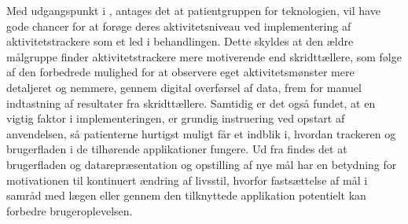 Med udgangspunkt i \cite{mercer2016}, antages det at patientgruppen for teknologien, vil have gode chancer for at forøge deres aktivitetsniveau ved implementering af aktivitetstrackere som et led i behandlingen. Dette skyldes at den ældre målgruppe finder aktivitetstrackere mere motiverende end skridttællere, som følge af den forbedrede mulighed for at observere eget aktivitetsmønster mere detaljeret og nemmere, gennem digital overførsel af data, frem for manuel indtastning af resultater fra skridttællere. Samtidig er det også fundet, at en vigtig faktor i implementeringen, er grundig instruering ved opstart af anvendelsen, så patienterne hurtigst muligt får et indblik i, hvordan trackeren og brugerfladen i de tilhørende applikationer fungere. Ud fra \cite{rapp2016} findes det at brugerfladen og datarepræsentation og opstilling af nye mål har en betydning for motivationen til kontinuert ændring af livsstil, hvorfor fastsættelse af mål i samråd med lægen eller gennem den tilknyttede applikation potentielt kan forbedre brugeroplevelsen.